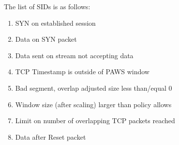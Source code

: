 \documentclass[english]{report}
\newenvironment{note}{
\samepage
    \vspace{10pt}{\textsf{
        {\hspace{7pt}\Huge{$\triangle$\hspace{-12.5pt}{\Large{$^!$}}}}\hspace{5pt}
        {\Large{NOTE}}
    }
    }
   \begin{center}
    \par\vspace{-17pt}

    \begin{lrbox}{\savepar}
    \begin{minipage}[r]{6in}
}
{
    \end{minipage}
    \end{lrbox}
    \fbox{
        \usebox{
            \savepar
	}
    }
    \par\vskip10pt
    \end{center}
}
\newenvironment{note}{
        \begin{rawhtml}
        <p><table border="1"><tr><td><b>
        Note:&nbsp;&nbsp;</b>
        \end{rawhtml}
}{
        \begin{rawhtml}
        </b></td></tr></table></p>
        \end{rawhtml}
}
\begin{document}
The list of SIDs is as follows:
\begin{enumerate}
\item{SYN on established session}
\item{Data on SYN packet}
\item{Data sent on stream not accepting data}
\item{TCP Timestamp is outside of PAWS window}
\item{Bad segment, overlap adjusted size less than/equal 0}
\item{Window size (after scaling) larger than policy allows}
\item{Limit on number of overlapping TCP packets reached}
\item{Data after Reset packet}
\end{enumerate}


\end{document}
